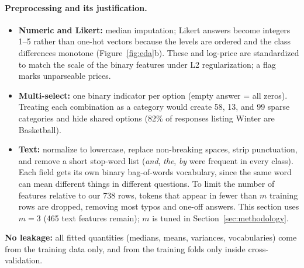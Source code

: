 \documentclass[11pt,letterpaper]{article}
\begin{document}
\paragraph{Preprocessing and its justification.}
\begin{itemize}
\item \textbf{Numeric and Likert:} median imputation; Likert answers become
integers 1--5 rather than one-hot vectors because the levels are ordered and the
class differences monotone (Figure~\ref{fig:eda}b). These and log-price are
standardized to match the scale of the binary features under L2 regularization; a
flag marks unparseable prices.
\item \textbf{Multi-select:} one binary indicator per option (empty answer = all
zeros). Treating each combination as a category would create 58, 13, and 99 sparse
categories and hide shared options (82\% of responses listing Winter are
Basketball).
\item \textbf{Text:} normalize to lowercase, replace non-breaking spaces, strip
punctuation, and remove a short stop-word list (\emph{and}, \emph{the}, \emph{by}
were frequent in every class). Each field gets its own binary bag-of-words
vocabulary, since the same word can mean different things in different questions.
To limit the number of features relative to our 738 rows, tokens that appear in
fewer than $m$ training rows are dropped, removing most typos and one-off answers.
This section uses $m = 3$ (465 text features remain); $m$ is tuned in
Section~\ref{sec:methodology}.
\end{itemize}
\textbf{No leakage:} all fitted quantities (medians, means, variances,
vocabularies) come from the training data only, and from the training folds only
inside cross-validation.

\end{document}
